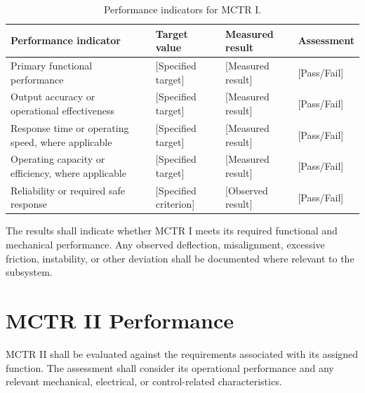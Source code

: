 \begin{table}[H]
    \centering
    \caption{Performance indicators for MCTR I.}
    \label{tab:mctr-i-performance}
    \renewcommand{\arraystretch}{1.4}
   \begin{tabularx}{\textwidth}{|X|X|X|X|}
        \hline
        \textbf{Performance indicator} &
        \textbf{Target value} &
        \textbf{Measured result} &
        \textbf{Assessment} \\
        \hline
        Primary functional performance &
        [Specified target] &
        [Measured result] &
        [Pass/Fail] \\
        \hline
        Output accuracy or operational effectiveness &
        [Specified target] &
        [Measured result] &
        [Pass/Fail] \\
        \hline
        Response time or operating speed,
        where applicable &
        [Specified target] &
        [Measured result] &
        [Pass/Fail] \\
        \hline
        Operating capacity or efficiency,
        where applicable &
        [Specified target] &
        [Measured result] &
        [Pass/Fail] \\
        \hline
        Reliability or required safe response &
        [Specified criterion] &
        [Observed result] &
        [Pass/Fail] \\
        \hline
    \end{tabularx}
\end{table}

The results shall indicate whether MCTR I meets its required
functional and mechanical performance. Any observed deflection,
misalignment, excessive friction, instability, or other deviation
shall be documented where relevant to the subsystem.

\section{MCTR II Performance}
\label{sec:mctr-ii-performance}

MCTR II shall be evaluated against the requirements associated
with its assigned function. The assessment shall consider its
operational performance and any relevant mechanical, electrical,
or control-related characteristics.

